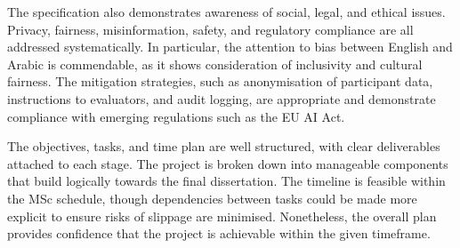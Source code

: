 \documentclass{report}
\begin{document}
The specification also demonstrates awareness of social, legal, and ethical issues. Privacy, fairness, misinformation, safety, and regulatory compliance are all addressed systematically. In particular, the attention to bias between English and Arabic is commendable, as it shows consideration of inclusivity and cultural fairness. The mitigation strategies, such as anonymisation of participant data, instructions to evaluators, and audit logging, are appropriate and demonstrate compliance with emerging regulations such as the EU AI Act.

The objectives, tasks, and time plan are well structured, with clear deliverables attached to each stage. The project is broken down into manageable components that build logically towards the final dissertation. The timeline is feasible within the MSc schedule, though dependencies between tasks could be made more explicit to ensure risks of slippage are minimised. Nonetheless, the overall plan provides confidence that the project is achievable within the given timeframe.
\end{document}
